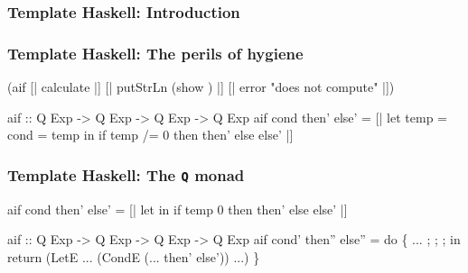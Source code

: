 \documentclass[svgnames,hyperref={bookmarks=false}]{beamer}
\begin{document}
\begin{frame}[fragile]
\frametitle<1>{Template Haskell: Introduction}
\frametitle<2>{Template Haskell: The perils of hygiene}
\begin{semiverbatim}
{\textdollar}(aif [| calculate |]
  [| putStrLn (show ) |]
  [| error "does not compute" |])

aif :: Q Exp -> Q Exp -> Q Exp -> Q Exp
aif cond then' else' =
  [| let temp = {\textdollar}cond
          = temp
     in if temp /= 0 then {\textdollar}then' else {\textdollar}else' |]
\end{semiverbatim}

\end{frame}

\begin{frame}[fragile]
\frametitle{Template Haskell: The \texttt{Q} monad}
\begin{semiverbatim}
aif cond then' else' =
  [| let 
         \text{\color{blue}{it = temp}}
     in if temp \text{\color{red}{/=}} 0 then {\textdollar}then' else {\textdollar}else' |]

aif :: Q Exp -> Q Exp -> Q Exp -> Q Exp
aif cond' then'' else'' =
    do \{ ...
       ; \text{\color{blue}{temp <- newName "temp"}}
       ; \text{\color{blue}{it <- newName "it"}}
       ; \text{\color{red}{let notEq = mkNameG_v "ghc-prim" "GHC.Classes" "/="}}
         in return (LetE ... (CondE (... then' else')) ...)
       \}
\end{semiverbatim}
\end{frame}
\end{document}
